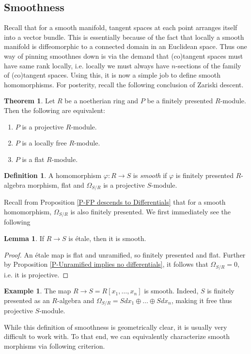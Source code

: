 \documentclass[letterpaper,10pt,twoside]{amsart}
\theoremstyle{proposition}
\theoremstyle{definition}
\newtheorem{definition}[proposition]{Definition}
\theoremstyle{theorem}
\newtheorem{theorem}[proposition]{Theorem}
\theoremstyle{definition}
\theoremstyle{definition}
\theoremstyle{definition}
\theoremstyle{lemma}
\newtheorem{lemma}[proposition]{\textbf{Lemma}}
\theoremstyle{definition}
\newtheorem{example}[proposition]{\textbf{Example}}
\theoremstyle{definition}
\theoremstyle{corollary}
\theoremstyle{definition}
\begin{document}
	\subsection{Smoothness}
	Recall that for a smooth manifold, tangent spaces at each point arranges itself into a vector bundle. This is essentially because of the fact that locally a smooth manifold is diffeomorphic to a connected domain in an Euclidean space. Thus one way of pinning smoothnes down is via the demand that (co)tangent spaces must have same rank locally, i.e. locally we must always have $n$-sections of the family of (co)tangent spaces. Using this, it is now a simple job to define smooth homomorphisms. For posterity, recall the following conclusion of Zariski descent.
	\begin{theorem}
		Let $R$ be a noetherian ring and $P$ be a finitely presented $R$-module. Then the following are equivalent:
		\begin{enumerate}
			\item {$P$ is a projective $R$-module.}
			\item {$P$ is a locally free $R$-module.}
			\item {$P$ is a flat $R$-module.}
		\end{enumerate}
	\end{theorem}
	\begin{definition}
		A homomorphism $\varphi: R\to S$ is \textit{smooth} if $\varphi$ is finitely presented $R$-algebra morphism, flat and $\Omega_{S/R}$ is a projective $S$-module. 
	\end{definition}
	Recall from Proposition \ref{P-FP descends to Differentials} that for a smooth homomorphism, $\Omega_{S/R}$ is also finitely presented. We first immediately see the following
	\begin{lemma}
		If $R\to S$ is \'etale, then it is smooth. 
	\end{lemma}
	\begin{proof}
		An \'etale map is flat and unramified, so finitely presented and flat. Further by Proposition \ref{P-Unramified implies no differentials}, it follows that $\Omega_{S/R} = 0$, i.e. it is projective.
	\end{proof}
	\begin{example}
		The map $R\to  S= R[x_1,\dots,x_n]$ is smooth. Indeed, $S$ is finitely presented as an $R$-algebra and $\Omega_{S/R} = Sdx_1\oplus \dots \oplus Sdx_n$, making it free thus projective $S$-module.
	\end{example}
	While this definition of smoothness is geometrically clear, it is usually very difficult to work with. To that end, we can equivalently characterize smooth morphisms via following criterion.
\end{document}

